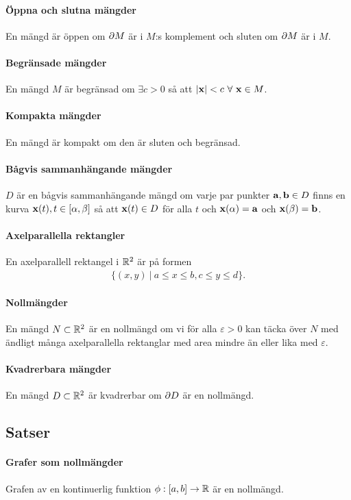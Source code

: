 \paragraph{Öppna och slutna mängder}
En mängd är öppen om $\partial M$ är i $M$:s komplement och sluten om $\partial M$ är i $M$.

\paragraph{Begränsade mängder}
En mängd $M$ är begränsad om $\exists c > 0$ så att $\abs{\vect{x}} < c\ \forall\ \vect{x}\in M$.

\paragraph{Kompakta mängder}
En mängd är kompakt om den är sluten och begränsad.

\paragraph{Bågvis sammanhängande mängder}
$D$ är en bågvis sammanhängande mängd om varje par punkter $\vect{a}, \vect{b}\in D$ finns en kurva $\vect{x}(t), t\in [\alpha, \beta]$ så att $\vect{x}(t)\in D$ för alla $t$ och $\vect{x}(\alpha) = \vect{a}$ och $\vect{x}(\beta) = \vect{b}$.

\paragraph{Axelparallella rektangler}
En axelparallell rektangel i $\mathbb{R}^2$ är på formen
\begin{align*}
	\{(x, y)\ |\ a\leq x\leq b, c\leq y\leq d\}.
\end{align*}

\paragraph{Nollmängder}
En mängd $N\subset\mathbb{R}^2$ är en nollmängd om vi för alla $\varepsilon > 0$ kan täcka över $N$ med ändligt många axelparallella rektanglar med area mindre än eller lika med $\varepsilon$.

\paragraph{Kvadrerbara mängder}
En mängd $D\subset\mathbb{R}^2$ är kvadrerbar om $\partial D$ är en nollmängd.

\subsection{Satser}

\paragraph{Grafer som nollmängder}
Grafen av en kontinuerlig funktion $\phi: [a, b]\to\mathbb{R}$ är en nollmängd.

\proof
